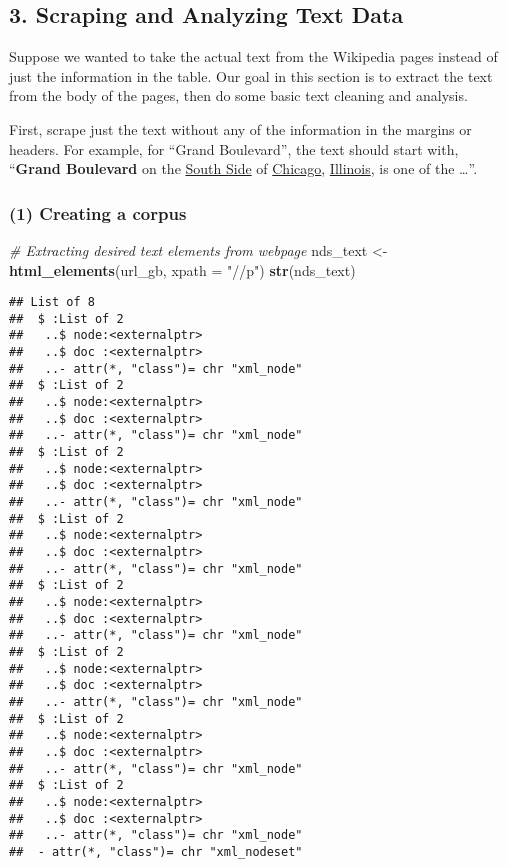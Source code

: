 \documentclass[
]{article}
\newenvironment{Shaded}{\begin{snugshade}}{\end{snugshade}}
\newcommand{\AttributeTok}[1]{\textcolor[rgb]{0.13,0.29,0.53}{#1}}
\newcommand{\CommentTok}[1]{\textcolor[rgb]{0.56,0.35,0.01}{\textit{#1}}}
\newcommand{\FunctionTok}[1]{\textcolor[rgb]{0.13,0.29,0.53}{\textbf{#1}}}
\newcommand{\NormalTok}[1]{#1}
\newcommand{\OtherTok}[1]{\textcolor[rgb]{0.56,0.35,0.01}{#1}}
\newcommand{\StringTok}[1]{\textcolor[rgb]{0.31,0.60,0.02}{#1}}
\begin{document}
\hypertarget{scraping-and-analyzing-text-data}{%
\subsection{3. Scraping and Analyzing Text
Data}\label{scraping-and-analyzing-text-data}}

Suppose we wanted to take the actual text from the Wikipedia pages
instead of just the information in the table. Our goal in this section
is to extract the text from the body of the pages, then do some basic
text cleaning and analysis.

First, scrape just the text without any of the information in the
margins or headers. For example, for ``Grand Boulevard'', the text
should start with, ``\textbf{Grand Boulevard} on the
\href{https://en.wikipedia.org/wiki/South_Side,_Chicago}{South Side} of
\href{https://en.wikipedia.org/wiki/Chicago}{Chicago},
\href{https://en.wikipedia.org/wiki/Illinois}{Illinois}, is one of the
\ldots{}''.

\hypertarget{creating-a-corpus}{%
\subsubsection{(1) Creating a corpus}\label{creating-a-corpus}}

\begin{Shaded}
\begin{Highlighting}[]
\CommentTok{\# Extracting desired text elements from webpage}
\NormalTok{nds\_text }\OtherTok{\textless{}{-}} \FunctionTok{html\_elements}\NormalTok{(url\_gb, }\AttributeTok{xpath =} \StringTok{"//p"}\NormalTok{)}
\FunctionTok{str}\NormalTok{(nds\_text)}
\end{Highlighting}
\end{Shaded}

\begin{verbatim}
## List of 8
##  $ :List of 2
##   ..$ node:<externalptr> 
##   ..$ doc :<externalptr> 
##   ..- attr(*, "class")= chr "xml_node"
##  $ :List of 2
##   ..$ node:<externalptr> 
##   ..$ doc :<externalptr> 
##   ..- attr(*, "class")= chr "xml_node"
##  $ :List of 2
##   ..$ node:<externalptr> 
##   ..$ doc :<externalptr> 
##   ..- attr(*, "class")= chr "xml_node"
##  $ :List of 2
##   ..$ node:<externalptr> 
##   ..$ doc :<externalptr> 
##   ..- attr(*, "class")= chr "xml_node"
##  $ :List of 2
##   ..$ node:<externalptr> 
##   ..$ doc :<externalptr> 
##   ..- attr(*, "class")= chr "xml_node"
##  $ :List of 2
##   ..$ node:<externalptr> 
##   ..$ doc :<externalptr> 
##   ..- attr(*, "class")= chr "xml_node"
##  $ :List of 2
##   ..$ node:<externalptr> 
##   ..$ doc :<externalptr> 
##   ..- attr(*, "class")= chr "xml_node"
##  $ :List of 2
##   ..$ node:<externalptr> 
##   ..$ doc :<externalptr> 
##   ..- attr(*, "class")= chr "xml_node"
##  - attr(*, "class")= chr "xml_nodeset"
\end{verbatim}
\end{document}
